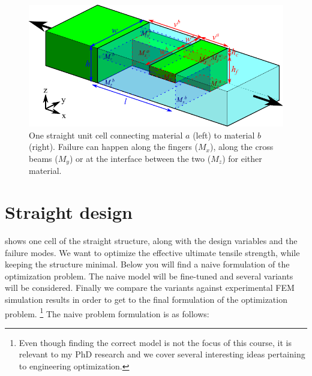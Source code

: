 
\newcommand{\hc}{h_\text{c}}
\newcommand{\hf}{h_\text{f}}

\newcommand{\sigmafail}{\sigma_\text{y}}
\newcommand{\sigmafailz}{\sigma_\text{yZ}}
\newcommand{\taufail}{\tau_\text{y}}
\newcommand{\tauz}{\tau_\text{yZ}}

\begin{figure}[H]
	\centering
	\includegraphics[width=\columnwidth]{sources/method/straight_model_v3.pdf}
	\caption{
		One straight unit cell connecting material $a$ (left) to material $b$ (right).
		Failure can happen along the fingers ($M_x$), along the cross beams ($M_y$) or at the interface between the two ($M_z$) for either material.}
	\label{fig:failure_modes}
\end{figure}


\section{Straight design}

 shows one cell of the straight structure, along with the design variables and the failure modes.
We want to optimize the effective ultimate tensile strength, while keeping the structure minimal.
Below you will find a naive formulation of the optimization problem.
The naive model will be fine-tuned and several variants will be considered.
Finally we compare the variants against experimental FEM simulation results in order to get to the final formulation of the optimization problem.
\footnote{Even though finding the correct model is not the focus of this course, it is relevant to my PhD research and we cover several interesting ideas pertaining to engineering optimization.}
The naive problem formulation is as follows:

